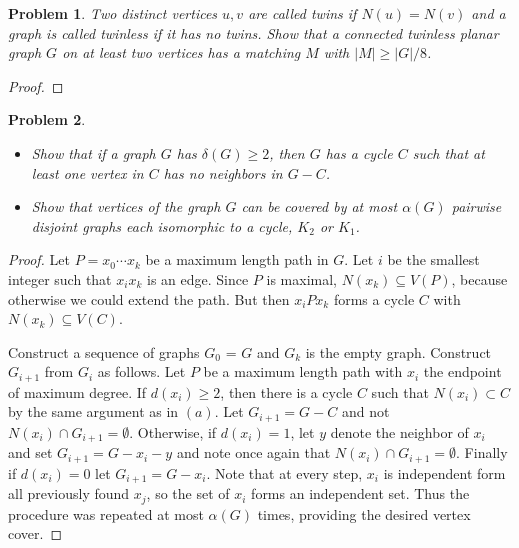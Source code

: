\documentclass[12pt]{article}
\newtheorem{problem}{Problem}
\begin{document}
\begin{problem} Two distinct vertices $u,v$ are called twins if
  $N(u) = N(v)$ and a graph is called twinless if it has no
  twins. Show that a connected twinless planar graph $G$ on at least
  two vertices has a matching $M$ with $|M| \geq |G|/8$.
\end{problem}
\begin{proof}
\end{proof}

\begin{problem}
  \begin{itemize}
  \item[(a)] Show that if a graph $G$ has $\delta(G) \geq 2$, then $G$
    has a cycle $C$ such that at least one vertex in $C$ has no
    neighbors in $G-C$.
  \item[(b)] Show that vertices of the graph $G$ can be covered by at
    most $\alpha(G)$ pairwise disjoint graphs each isomorphic to a
    cycle, $K_2$ or $K_1$.
  \end{itemize}
\end{problem}
\begin{proof}
\item[(a)] Let $P = x_0\cdots x_k$ be a maximum length path in
  $G$. Let $i$ be the smallest integer such that $x_i x_k$ is an
  edge. Since $P$ is maximal, $N(x_k) \subseteq V(P)$, because
  otherwise we could extend the path. But then $x_i P x_k$ forms a
  cycle $C$ with $N(x_k) \subseteq V(C)$.
\item[(b)] Construct a sequence of graphs $G_0$ = $G$ and $G_k$ is the
  empty graph. Construct $G_{i + 1}$ from $G_i$ as follows. Let $P$ be
  a maximum length path with $x_i$ the endpoint of maximum degree. If
  $d(x_i) \geq 2$, then there is a cycle $C$ such that
  $N(x_i) \subset C$ by the same argument as in $(a)$. Let
  $G_{i+1} = G - C$ and not $N(x_i) \cap G_{i + 1} =
  \emptyset$. Otherwise, if $d(x_i) = 1$, let $y$ denote the neighbor
  of $x_i$ and set $G_{i+1} = G - x_i - y$ and note once again that
  $N(x_i) \cap G_{i+1} = \emptyset$. Finally if $d(x_i) = 0$ let
  $G_{i + 1} = G - x_i$. Note that at every step, $x_i$ is independent
  form all previously found $x_j$, so the set of $x_i$ forms an
  independent set. Thus the procedure was repeated at most $\alpha(G)$
  times, providing the desired vertex cover.
\end{proof}
\end{document}
